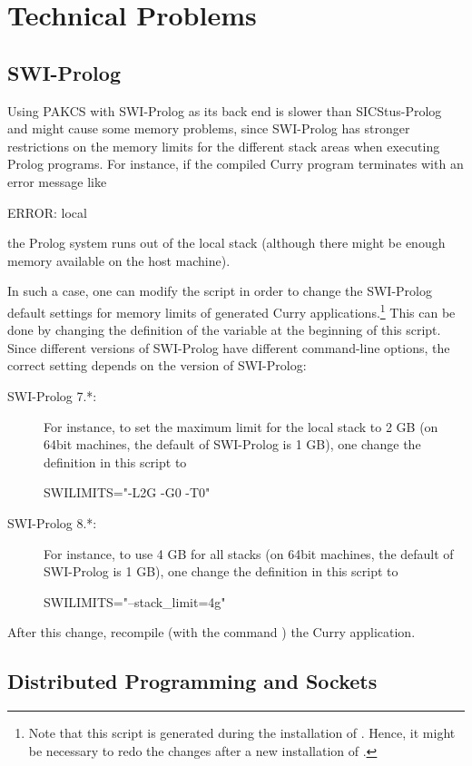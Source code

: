 \section{Technical Problems}

\subsection{SWI-Prolog}

Using PAKCS with SWI-Prolog as its back end is slower than
SICStus-Prolog and might cause some memory problems,
since SWI-Prolog has stronger restrictions on the memory limits
for the different stack areas when executing Prolog programs.
For instance, if the compiled Curry program terminates
with an error message like
\begin{curry}
ERROR: local
\end{curry}
the Prolog system runs out of the local stack (although there
might be enough memory available on the host machine).

In such a case, one can modify the script
in order to change the SWI-Prolog default settings
for memory limits of generated Curry applications.\footnote{%
Note that this script is generated
during the installation of \CYS. Hence, it might be necessary
to redo the changes after a new installation of \CYS.}
This can be done by changing the definition of the variable
 at the beginning of this script.
Since different versions of SWI-Prolog have different command-line options,
the correct setting depends on the version of SWI-Prolog:
\begin{description}
\item[SWI-Prolog 7.*:]
For instance, to set the maximum limit for
the local stack to 2 GB (on 64bit machines, the default of SWI-Prolog
is 1 GB), one change the definition in this script to
\begin{curry}
SWILIMITS="-L2G -G0 -T0"
\end{curry}
\item[SWI-Prolog 8.*:]
For instance, to use 4 GB for all stacks
(on 64bit machines, the default of SWI-Prolog is 1 GB),
one change the definition in this script to
\begin{curry}
SWILIMITS="--stack_limit=4g"
\end{curry}
\end{description}
After this change, recompile (with the \CYS command )
the Curry application.


\subsection{Distributed Programming and Sockets}

